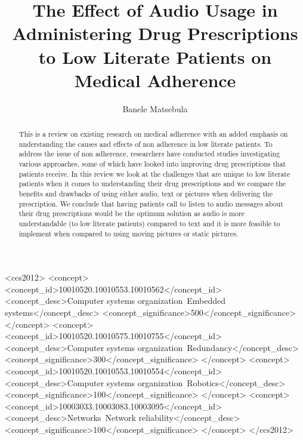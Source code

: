 \documentclass[sigchi, review]{acmart}
\begin{document}
\title{The Effect of Audio Usage in Administering Drug Prescriptions to Low Literate Patients on Medical Adherence}

\author{Banele Matsebula}


\renewcommand{\shortauthors}{B. Trovato et al.}


\begin{abstract}
This is a review on existing research on medical adherence with an added emphasis on understanding the causes and effects of non adherence in low literate patients. To address the issue of non adherence, researchers have conducted studies investigating various approaches, some of which have looked into improving drug prescriptions that patients receive. In this review we look at the challenges that are unique to low literate patients when it comes to understanding their drug prescriptions and we compare the benefits and drawbacks of using either audio, text or pictures when delivering the prescription. We conclude that having patients call to listen to audio messages about their drug prescriptions would be the optimum solution as audio is more understandable (to low literate patients) compared to text and it is more feasible to implement when compared to using moving pictures or static pictures.
\end{abstract}

%
%
\begin{CCSXML}
<ccs2012>
 <concept>
  <concept_id>10010520.10010553.10010562</concept_id>
  <concept_desc>Computer systems organization~Embedded systems</concept_desc>
  <concept_significance>500</concept_significance>
 </concept>
 <concept>
  <concept_id>10010520.10010575.10010755</concept_id>
  <concept_desc>Computer systems organization~Redundancy</concept_desc>
  <concept_significance>300</concept_significance>
 </concept>
 <concept>
  <concept_id>10010520.10010553.10010554</concept_id>
  <concept_desc>Computer systems organization~Robotics</concept_desc>
  <concept_significance>100</concept_significance>
 </concept>
 <concept>
  <concept_id>10003033.10003083.10003095</concept_id>
  <concept_desc>Networks~Network reliability</concept_desc>
  <concept_significance>100</concept_significance>
 </concept>
</ccs2012>
\end{CCSXML}



\maketitle





\end{document}
